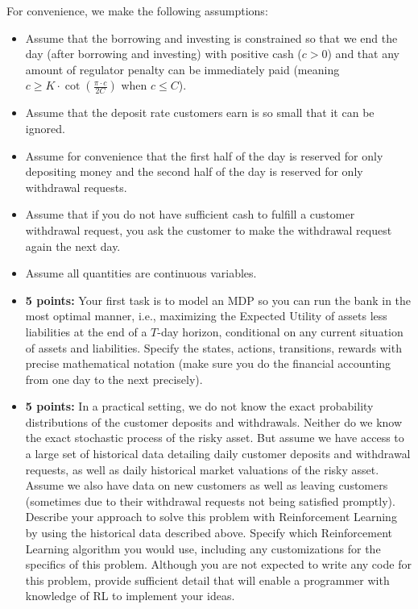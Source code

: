 \documentclass[12pt]{exam}
\begin{document}
\begin{questions}
For convenience, we make the following assumptions:
\begin{itemize}
\item  Assume that the borrowing and investing is constrained so that we end the day (after borrowing and investing) with positive cash ($c >  0$) and that any amount of regulator penalty can be immediately paid (meaning $c \geq K \cdot \cot(\frac {\pi \cdot c}{2C})$ when $c \leq C$).
\item Assume that the deposit rate customers earn is so small that it can be ignored.
\item Assume for convenience that the first half of the day is reserved for only depositing money and the second half of the day is reserved for only withdrawal requests.
\item Assume that if you do not have sufficient cash to fulfill a customer withdrawal request, you ask the customer to make the withdrawal request again the next day.
\item Assume all quantities are continuous variables.
\end{itemize}

\begin{itemize}
\item {\bf 5 points:} Your first task is to model an MDP so you can run the bank in the most optimal manner, i.e., maximizing the Expected Utility of assets less liabilities at the end of a $T$-day horizon, conditional on any current situation of assets and liabilities. Specify the states, actions, transitions, rewards with precise mathematical notation (make sure you do the financial accounting from one day to the next precisely).
\item {\bf 5 points:} In a practical setting, we do not know the exact probability distributions of the customer deposits and withdrawals. Neither do we know the exact stochastic process of the risky asset. But assume we have access to a large set of historical data detailing daily customer deposits and withdrawal requests, as well as daily historical market valuations of the risky asset. Assume we also have data on new customers as well as leaving customers (sometimes due to their withdrawal requests not being satisfied promptly). Describe your approach to solve this problem with Reinforcement Learning by using the historical data described above. Specify which Reinforcement Learning algorithm you would use, including any customizations for the specifics of this problem. Although you are not expected to write any code for this problem, provide sufficient detail that will enable a programmer with knowledge of RL to implement your ideas.
\end{itemize}


\end{questions}
\end{document}

